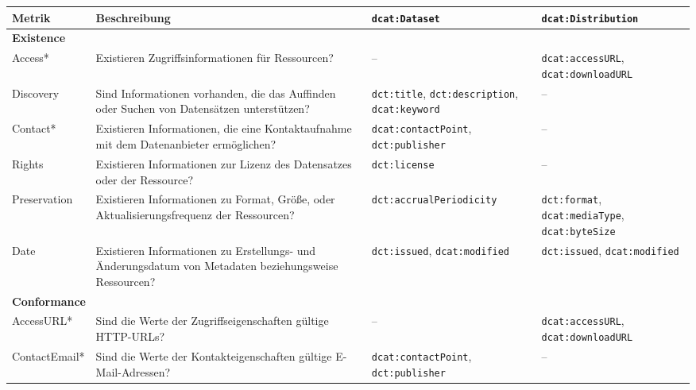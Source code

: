 \begin{table}[h!]
\tiny
\centering
\addtolength{\leftskip}{-6cm}
\addtolength{\rightskip}{-6cm}
\renewcommand{\arraystretch}{0.95}
\begin{tabular}{|p{2cm}|p{5.8cm}|p{3.1cm}|p{3.1cm}|}
\hline
\textbf{Metrik} & \textbf{Beschreibung} & \textbf{\texttt{dcat:Dataset}} & \textbf{\texttt{dcat:Distribution}} \\
\hline

\multicolumn{4}{|l|}{\textbf{Existence}} \\ \hline
Access* & Existieren Zugriffsinformationen für Ressourcen? 
& -- 
& \texttt{dcat:accessURL}, \texttt{dcat:downloadURL} \\ \hline

Discovery & Sind Informationen vorhanden, die das Auffinden oder Suchen von Datensätzen unterstützen? 
& \texttt{dct:title}, \texttt{dct:description}, \texttt{dcat:keyword} 
& -- \\ \hline

Contact* & Existieren Informationen, die eine Kontaktaufnahme mit dem Datenanbieter ermöglichen? 
& \texttt{dcat:contactPoint}, \texttt{dct:publisher} 
& -- \\ \hline

Rights & Existieren Informationen zur Lizenz des Datensatzes oder der Ressource? 
& \texttt{dct:license} 
& -- \\ \hline

Preservation & Existieren Informationen zu Format, Größe, oder Aktualisierungsfrequenz der Ressourcen? 
& \texttt{dct:accrualPeriodicity} 
& \texttt{dct:format}, \texttt{dcat:mediaType}, \texttt{dcat:byteSize} \\ \hline

Date & Existieren Informationen zu Erstellungs- und Änderungsdatum von Metadaten beziehungsweise Ressourcen? 
& \texttt{dct:issued}, \texttt{dcat:modified} 
& \texttt{dct:issued}, \texttt{dcat:modified} \\ \hline

\multicolumn{4}{|l|}{\textbf{Conformance}} \\ \hline
AccessURL* & Sind die Werte der Zugriffseigenschaften gültige HTTP-URLs? 
& -- 
& \texttt{dcat:accessURL}, \texttt{dcat:downloadURL} \\ \hline

ContactEmail* & Sind die Werte der Kontakteigenschaften gültige E-Mail-Adressen? 
& \texttt{dcat:contactPoint}, \texttt{dct:publisher} 
& -- \\ \hline


\end{tabular}
\end{table}
